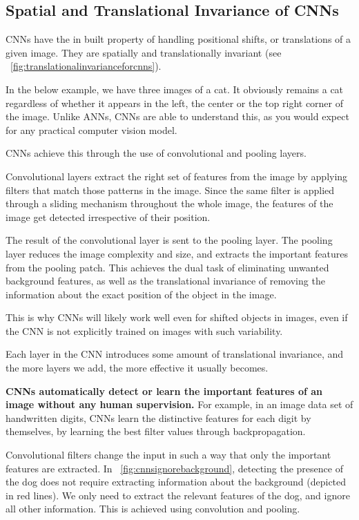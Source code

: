 	\subsection{Spatial and Translational Invariance of CNNs}

	\begin{bulletedlist}
		\item CNNs have the in built property of handling positional shifts, or translations of a given image. They are
spatially and translationally invariant (see \figurename~\ref{fig:translationalinvarianceforcnns}).
		\item In the below example, we have three images of a cat.  It obviously remains a cat regardless of whether it appears in the left, the center or the top right corner of the image.  Unlike ANNs, CNNs are able to understand this, as you would expect for any practical computer vision model.
		\item CNNs achieve this through the use of convolutional and pooling layers.
		\item Convolutional layers extract the right set of features from the image by applying filters that match those patterns in the image. Since the same filter is applied through a sliding mechanism throughout the whole image, the features of the image get detected irrespective of their position.
		\item The result of the convolutional layer is sent to the pooling layer. The pooling layer reduces the image complexity and size, and extracts the important features from the pooling patch. This achieves the dual task of eliminating unwanted background features, as well as the translational invariance of removing the information about the exact position of the object in the image.
		\item This is why CNNs will likely work well even for shifted objects in images, even if the CNN is not explicitly trained on images with such variability.
		\item Each layer in the CNN introduces some amount of translational invariance, and the more layers we add, the more effective it usually becomes.
		\item \textbf{CNNs automatically detect or learn the important features of an image without any human supervision.} For example, in an image data set of handwritten digits, CNNs learn the distinctive features for each digit by themselves, by learning the best filter values through backpropagation.
		\item Convolutional filters change the input in such a way that only the important features are extracted.  In \figurename~\ref{fig:cnnsignorebackground}, detecting the presence of the dog does not require extracting information about the background (depicted in red lines).  We only need to extract the relevant features of the dog, and ignore all other information.  This is achieved using convolution and pooling.
	\end{bulletedlist}

